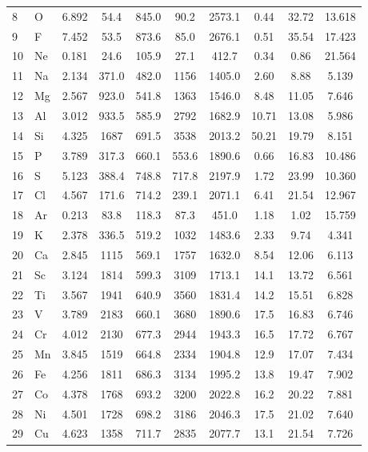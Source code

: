 \documentclass[12pt,a4paper]{article}
\theoremstyle{remark}
\begin{document}
\begin{longtable}{@{}llcccccccc@{}}
		8  & O   & 6.892 & 54.4   & 845.0  & 90.2   & 2573.1 & 0.44  & 32.72 & 13.618 \\
		9  & F   & 7.452 & 53.5   & 873.6  & 85.0   & 2676.1 & 0.51  & 35.54 & 17.423 \\
		10 & Ne  & 0.181 & 24.6   & 105.9  & 27.1   & 412.7  & 0.34  & 0.86  & 21.564 \\
		11 & Na  & 2.134 & 371.0  & 482.0  & 1156   & 1405.0 & 2.60  & 8.88  & 5.139 \\
		12 & Mg  & 2.567 & 923.0  & 541.8  & 1363   & 1546.0 & 8.48  & 11.05 & 7.646 \\
		13 & Al  & 3.012 & 933.5  & 585.9  & 2792   & 1682.9 & 10.71 & 13.08 & 5.986 \\
		14 & Si  & 4.325 & 1687   & 691.5  & 3538   & 2013.2 & 50.21 & 19.79 & 8.151 \\
		15 & P   & 3.789 & 317.3  & 660.1  & 553.6  & 1890.6 & 0.66  & 16.83 & 10.486 \\
		16 & S   & 5.123 & 388.4  & 748.8  & 717.8  & 2197.9 & 1.72  & 23.99 & 10.360 \\
		17 & Cl  & 4.567 & 171.6  & 714.2  & 239.1  & 2071.1 & 6.41  & 21.54 & 12.967 \\
		18 & Ar  & 0.213 & 83.8   & 118.3  & 87.3   & 451.0  & 1.18  & 1.02  & 15.759 \\
		19 & K   & 2.378 & 336.5  & 519.2  & 1032   & 1483.6 & 2.33  & 9.74  & 4.341 \\
		20 & Ca  & 2.845 & 1115   & 569.1  & 1757   & 1632.0 & 8.54  & 12.06 & 6.113 \\
		21 & Sc  & 3.124 & 1814   & 599.3  & 3109   & 1713.1 & 14.1  & 13.72 & 6.561 \\
		22 & Ti  & 3.567 & 1941   & 640.9  & 3560   & 1831.4 & 14.2  & 15.51 & 6.828 \\
		23 & V   & 3.789 & 2183   & 660.1  & 3680   & 1890.6 & 17.5  & 16.83 & 6.746 \\
		24 & Cr  & 4.012 & 2130   & 677.3  & 2944   & 1943.3 & 16.5  & 17.72 & 6.767 \\
		25 & Mn  & 3.845 & 1519   & 664.8  & 2334   & 1904.8 & 12.9  & 17.07 & 7.434 \\
		26 & Fe  & 4.256 & 1811   & 686.3  & 3134   & 1995.2 & 13.8  & 19.47 & 7.902 \\
		27 & Co  & 4.378 & 1768   & 693.2  & 3200   & 2022.8 & 16.2  & 20.22 & 7.881 \\
		28 & Ni  & 4.501 & 1728   & 698.2  & 3186   & 2046.3 & 17.5  & 21.02 & 7.640 \\
		29 & Cu  & 4.623 & 1358   & 711.7  & 2835   & 2077.7 & 13.1  & 21.54 & 7.726 \\

\end{longtable}
\end{document}

